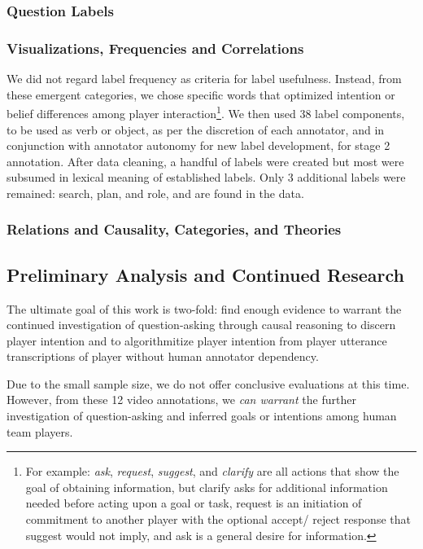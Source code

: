 \documentclass[10pt]{article}
\begin{document}
\subsubsection{Question Labels}



\subsubsection{Visualizations, Frequencies and Correlations}

We did not regard label frequency as criteria for label usefulness. Instead, from these emergent categories, we chose specific words that optimized intention or belief differences among player interaction\footnote{For example: \emph{ask}, \emph{request}, \emph{suggest}, and \emph{clarify} are all actions that show the goal of obtaining information, but clarify asks for additional information needed before acting upon a goal or task, request is an initiation of commitment to another player with the optional accept/ reject response that suggest would not imply, and ask is a general desire for information.}. We then used 38 label components, to be used as verb or object, as per the discretion of each annotator, and in conjunction with annotator autonomy for new label development, for stage 2 annotation. After data cleaning, a handful of labels were created but most were subsumed in lexical meaning of established labels. Only 3 additional labels were remained: search, plan, and role, and are found in the data.



\subsubsection{Relations and Causality, Categories, and Theories}

\subsection{Preliminary Analysis and Continued Research}
The ultimate goal of this work is two-fold: find enough evidence to warrant the continued investigation of question-asking through causal reasoning to discern player intention and to algorithmitize player intention from player utterance transcriptions of player without human annotator dependency. 

Due to the small sample size, we do not offer conclusive evaluations at this time. However, from these 12 video annotations, we \emph{can warrant} the further investigation of question-asking and inferred goals or intentions among human team players.
\end{document}
